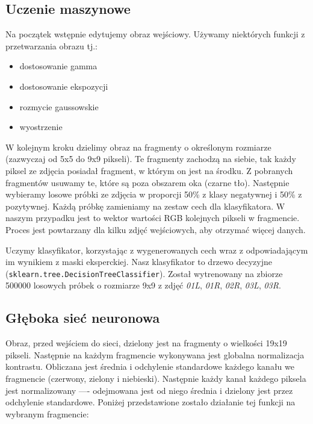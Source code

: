 \documentclass[polish,polish,a4paper]{article}
\begin{document}
		\subsection{Uczenie maszynowe}
			Na początek wstępnie edytujemy obraz wejściowy. Używamy niektórych funkcji z przetwarzania obrazu tj.:
			\begin{itemize}
				\item dostosowanie gamma
				\item dostosowanie ekspozycji
				\item rozmycie gaussowskie
				\item wyostrzenie
			\end{itemize}
			W kolejnym kroku dzielimy obraz na fragmenty o określonym rozmiarze (zazwyczaj od 5x5 do 9x9 pikseli).
			Te fragmenty zachodzą na siebie, tak każdy piksel ze zdjęcia posiadał fragment, w którym on jest na środku.
			Z pobranych fragmentów usuwamy te, które są poza obszarem oka (czarne tło).
			Następnie wybieramy losowe próbki ze zdjęcia w proporcji 50\% z klasy negatywnej i 50\% z pozytywnej.
			Każdą próbkę zamieniamy na zestaw cech dla klasyfikatora.
			W naszym przypadku jest to wektor wartości RGB kolejnych pikseli w fragmencie. 
			Proces jest powtarzany dla kilku zdjęć wejściowych, aby otrzymać więcej danych.
			
			Uczymy klasyfikator, korzystając z wygenerowanych cech wraz z odpowiadającym im wynikiem z maski eksperckiej. 
			Nasz klasyfikator to drzewo decyzyjne (\texttt{sklearn.tree.DecisionTreeClassifier}).
			Został wytrenowany na zbiorze 500000 losowych próbek o rozmiarze 9x9 z zdjęć 
			\textit{01L}, \textit{01R}, \textit{02R}, \textit{03L}, \textit{03R}.
		
		\subsection{Głęboka sieć neuronowa}
			Obraz, przed wejściem do sieci, dzielony jest na fragmenty o wielkości 19x19 pikseli.
Następnie na każdym fragmencie wykonywana jest globalna normalizacja kontrastu.
Obliczana jest średnia i odchylenie standardowe każdego kanału we fragmencie (czerwony, zielony i niebieski).
Następnie każdy kanał każdego piksela jest normalizowany —- odejmowana
jest od niego średnia i dzielony jest przez odchylenie standardowe.
Poniżej przedstawione zostało działanie tej funkcji na wybranym fragmencie:
\end{document}
